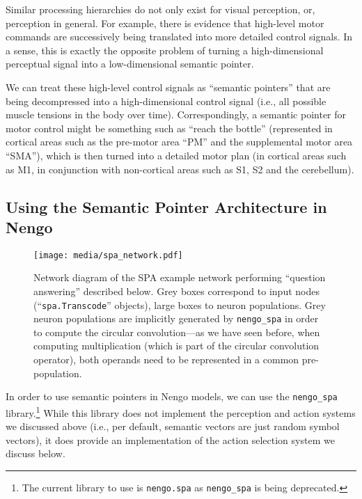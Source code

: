 \documentclass[10pt,letterpaper,oneside]{article}
\begin{document}
Similar processing hierarchies do not only exist for visual perception, or, perception in general. For example, there is evidence that high-level motor commands are successively being translated into more detailed control signals. In a sense, this is exactly the opposite problem of turning a high-dimensional perceptual signal into a low-dimensional semantic pointer. 

We can treat these high-level control signals as \enquote{semantic pointers} that are being decompressed into a high-dimensional control signal (i.e., all possible muscle tensions in the body over time). Correspondingly, a semantic pointer for motor control might be something such as \enquote{reach the bottle} (represented in cortical areas such as the pre-motor area \enquote{PM} and the supplemental motor area \enquote{SMA}), which is then turned into a detailed motor plan (in cortical areas such as M1, in conjunction with non-cortical areas such as S1, S2 and the cerebellum).


\subsection{Using the Semantic Pointer Architecture in Nengo}

\begin{figure}
	\centering
	\texttt{[image: media/spa\_network.pdf]}
	\caption{Network diagram of the SPA example network performing \enquote{question answering} described below. Grey boxes correspond to input nodes (\enquote{\texttt{spa.Transcode}} objects), large boxes to neuron populations. Grey neuron populations are implicitly generated by \texttt{nengo\_spa} in order to compute the circular convolution---as we have seen before, when computing multiplication (which is part of the circular convolution operator), both operands need to be represented in a common pre-population.}
	\label{fig:spa_network}
\end{figure}

In order to use semantic pointers in Nengo models, we can use the \texttt{nengo\_spa} library.\footnote{The current library to use is \texttt{nengo.spa} as \texttt{nengo\_spa} is being deprecated.} While this library does not implement the perception and action systems we discussed above (i.e., per default, semantic vectors are just random symbol vectors), it does provide an implementation of the action selection system we discuss below.
\end{document}
